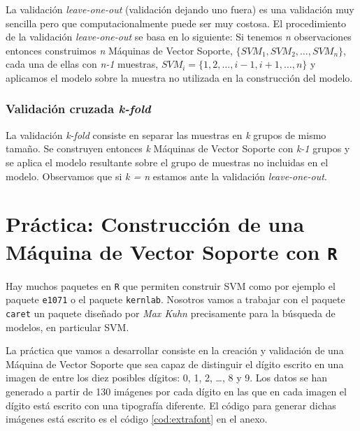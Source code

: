 \documentclass[12pt,spanish,a4paper]{article}
\numberwithin{equation}{section}
\begin{document}
La validación \emph{leave-one-out} (validación dejando uno fuera) es una
validación muy sencilla pero que computacionalmente puede ser muy
costosa. El procedimiento de la validación \emph{leave-one-out} se basa
en lo siguiente: Si tenemos \emph{n} observaciones entonces construimos
\emph{n} Máquinas de Vector Soporte,
\(\{SVM_1, SVM_2, \ldots, SVM_n\}\), cada una de ellas con \emph{n-1}
muestras, \(SVM_i = \{1, 2, \ldots, i-1, i+1, \ldots, n \}\) y aplicamos
el modelo sobre la muestra no utilizada en la construcción del modelo.

\hypertarget{validacion-cruzada-k-fold}{%
\subsubsection{\texorpdfstring{Validación cruzada
\emph{k-fold}}{Validación cruzada k-fold}}\label{validacion-cruzada-k-fold}}

La validación \emph{k-fold} consiste en separar las muestras en \emph{k}
grupos de mismo tamaño. Se construyen entonces \emph{k} Máquinas de
Vector Soporte con \emph{k-1} grupos y se aplica el modelo resultante
sobre el grupo de muestras no incluidas en el modelo. Observamos que si
\emph{k = n} estamos ante la validación \emph{leave-one-out}.

\clearpage
\newpage

\hypertarget{practica-construccion-de-una-maquina-de-vector-soporte-con-r}{%
\section{\texorpdfstring{Práctica: Construcción de una Máquina de Vector
Soporte con
\texttt{R}}{Práctica: Construcción de una Máquina de Vector Soporte con R}}\label{practica-construccion-de-una-maquina-de-vector-soporte-con-r}}

Hay muchos paquetes en \texttt{R} que permiten construir SVM como por
ejemplo el paquete \texttt{e1071} o el paquete \texttt{kernlab}.
Nosotros vamos a trabajar con el paquete \texttt{caret} un paquete
diseñado por \emph{Max Kuhn} precisamente para la búsqueda de modelos,
en particular SVM.

La práctica que vamos a desarrollar consiste en la creación y validación
de una Máquina de Vector Soporte que sea capaz de distinguir el dígito
escrito en una imagen de entre los diez posibles dígitos: 0, 1, 2,
\ldots{}, 8 y 9. Los datos se han generado a partir de 130 imágenes por
cada dígito en las que en cada imagen el dígito está escrito con una
tipografía diferente. El código para generar dichas imágenes está
escrito es el código \ref{cod:extrafont} en el anexo.
\end{document}
